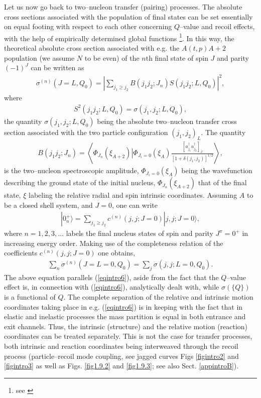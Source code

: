 Let us now go back to two--nucleon transfer (pairing) processes. The  absolute cross sections associated with the population of  final states can be set essentially on equal footing with respect to each other  concerning  $Q$--value and recoil effects, with the help of empirically determined global functions \footnote{see \cite{Broglia:72b}}. In this way, the theoretical absolute cross section associated with e.g. the $A(t,p)A+2$ population (we assume $N$ to be even) of the $n$th final state of spin $J$ and parity $(-1)^J$ can be written as 
\begin{align}
\sigma^{(n)}(J=L,Q_0)=\left|\sum_{j_1\geq j_2}B(j_1 j_2;J_n)S(j_1 j_2 ;L,Q_0)\right|^2,
\end{align}
where
\begin{align}
S^2(j_1 j_2 ;L,Q_0)=\sigma(j_1,j_2;L,Q_0),
\end{align}
the quantity $\sigma(j_1,j_2;L,Q_0)$ being the absolute two--nucleon transfer cross section associated with the two particle configuration $(j_1,j_2)_L$.
The quantity
\begin{align}
B(j_1j_2;J_n)=\left\langle \Phi_{J_n}(\xi_{A+2})\left|\Phi_{J_i=0}(\xi_A)\right.\frac{\left[a^\dagger_{j_1}a^\dagger_{j_2}\right]_J}{\left[1+\delta(j_1,j_2)\right]^{1/2}}\right\rangle,
\end{align}
is the two--nucleon spectroscopic amplitude, $\Phi_{J_i=0}(\xi_A)$ being the wavefunction describing the ground state of the initial nucleus, $\Phi_{J_n}(\xi_{A+2})$ that of the final state, $\xi$ labeling the relative radial and spin intrinsic coordinates. Assuming $A$ to be a closed shell system, and $J=0$, one can write
\begin{align}
|0^+_n\rangle=\sum_{j_1\geq j_2}c^{(n)}(j,j;J=0)|j,j;J=0\rangle,
\end{align}
where $n=1,2,3,\dots$ labels the final nucleus states of spin and parity $J^\pi=0^+$ in increasing energy order. Making use of the completeness relation of the coefficients $c^{(n)}(j,j;J=0)$ one obtains,
\begin{align}\label{eqintro12}
\sum_n \sigma^{(n)}(J=L=0,Q_0)=\sum_j\sigma(j,j;L=0,Q_0).
\end{align}
The above equation parallels (\ref{eqintro6}), aside from the fact that the $Q$--value effect is, in connection with (\ref{eqintro6}), analytically dealt with, while $\sigma(\{Q\})$ is a functional of $Q$. The complete separation of the relative and intrinsic motion coordinates taking place in e.g. (\ref{eqintro6}) is in keeping with the fact that in elastic and inelastic processes the mass partition is equal in both entrance and exit channels. Thus, the intrinsic (structure) and the relative motion (reaction) coordinates can be treated separately. This is not the case for transfer processes, both intrinsic and reaction coordinates being interweaved through the recoil process (particle--recoil mode coupling, see jagged curves Figs \ref{figintro2} and \ref{figintro3} as well as Figs. \ref{fig1.9.2} and \ref{fig1.9.3}; see also Sect. \ref{appintroB}). 





